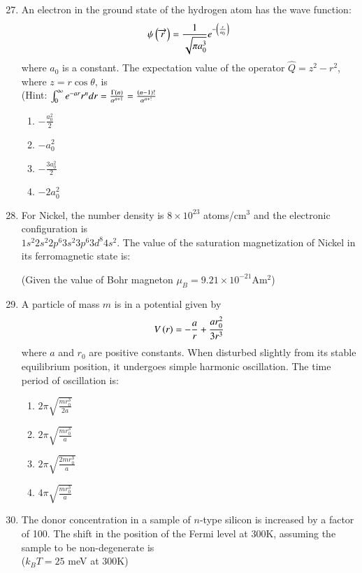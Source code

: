 \documentclass[journal,9pt,onecolumn]{IEEEtran}
\begin{document}
\begin{enumerate}
\setcounter{enumi}{26}
\item An electron in the ground state of the hydrogen atom has the wave function: $$\psi \left(\overrightarrow{r}\right) = \frac{1}{\sqrt{\pi a_0^3}} e^{-\left(\frac{r}{a_0}\right)}$$ where $a_0$ is a constant. The expectation value of the operator $\hat{Q} = z^2 - r^2$, where $z = r \cos \theta$, is\\(Hint: $\int_0^\infty e^{-ar} r^ndr=\frac{\Gamma\left(n\right)}{\alpha^{n+1}}=\frac{\left(n-1\right)!}{\alpha^{n+!}}$
\begin{multicols}{4}
\begin{enumerate}
    \item $-\frac{a_0^2}{2}$
    \item $-a_0^2$
    \item $-\frac{3a_0^2}{2}$
    \item $-2a_0^2$
\end{enumerate}
\end{multicols}

\item For Nickel, the number density is $8 \times 10^{23}$ atoms/cm$^3$ and the electronic configuration is \\$1 s^2 2 s^2 2 p^6 3 s^2 3 p^6 3 d^8 4 s^2$. The value of the saturation magnetization of Nickel in its ferromagnetic state is:

(Given the value of Bohr magneton $\mu_B = 9.21 \times 10^{-21}$Am$^2$)


\item A particle of mass $m$ is in a potential given by $$V \left(r\right) = -\frac{a}{r} + \frac{a r_0^2}{3 r^3}$$ where $a$ and $r_0$ are positive constants. When disturbed slightly from its stable equilibrium position, it undergoes simple harmonic oscillation. The time period of oscillation is:

\begin{multicols}{4}
\begin{enumerate}
    \item $2\pi \sqrt{\frac{m r_0^3}{2a}}$
    \item $2\pi \sqrt{\frac{m r_0^3}{a}}$
    \item $2\pi \sqrt{\frac{2 m r_0^3}{a}}$
    \item $4\pi \sqrt{\frac{m r_0^3}{a}}$
\end{enumerate}
\end{multicols}

\item The donor concentration in a sample of $n$-type silicon is increased by a factor of 100. The shift in the position of the Fermi level at 300K, assuming the sample to be non-degenerate is \\  
($k_B T = 25$ meV at 300K)





\end{enumerate}
\end{document}
